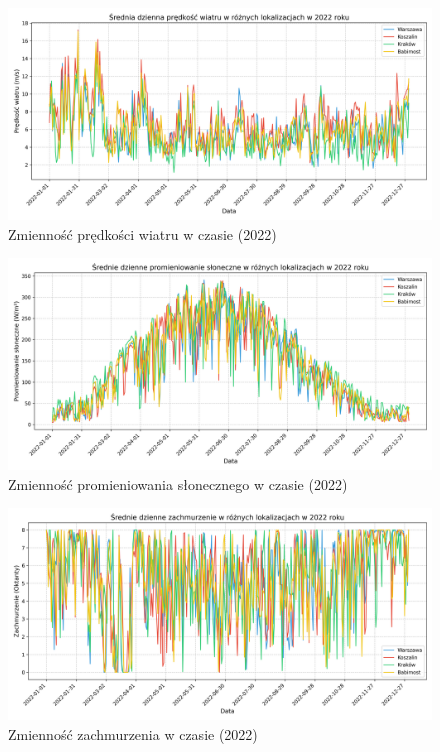 \begin{figure}[H]
    \centering
    \includegraphics[width=\textwidth]{../plots/weather/wind_speed_time_series_2022.png}
    \caption{Zmienność prędkości wiatru w czasie (2022)}
    \label{fig:wind-speed-time-series-2022}
\end{figure}

\begin{figure}[H]
    \centering
    \includegraphics[width=\textwidth]{../plots/weather/solar_radiation_time_series_2022.png}
    \caption{Zmienność promieniowania słonecznego w czasie (2022)}
    \label{fig:solar-radiation-time-series-2022}
\end{figure}

\begin{figure}[H]
    \centering
    \includegraphics[width=\textwidth]{../plots/weather/cloud_cover_time_series_2022.png}
    \caption{Zmienność zachmurzenia w czasie (2022)}
    \label{fig:cloud-cover-time-series-2022}
\end{figure}

